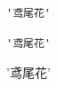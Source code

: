\documentclass{article}
\begin{document}
\begin{verbatim}
'鸢尾花'
\end{verbatim}
\begin{Verbatim}
'鸢尾花'
\end{Verbatim}
\begin{Highlighting}
'鸢尾花'
\end{Highlighting}
\end{document}
